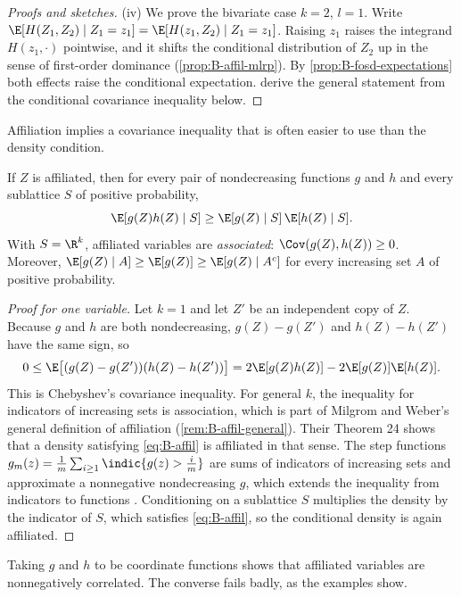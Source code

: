 \begin{proof}[Proofs and sketches]
(iv) We prove the bivariate case $k = 2$, $l = 1$. Write $\E[H(Z_1, Z_2) \mid Z_1 = z_1] = \E[H(z_1, Z_2) \mid Z_1 = z_1]$. Raising
$z_1$ raises the integrand $H(z_1, \cdot)$ pointwise, and it shifts the conditional distribution of $Z_2$ up in the sense of
first-order dominance (\cref{prop:B-affil-mlrp}). By \cref{prop:B-fosd-expectations} both effects raise the
conditional expectation. \citet[Appendix]{MilgromWeber1982} derive the general statement from the conditional
covariance inequality below.
\end{proof}

Affiliation implies a covariance inequality that is often easier to use than the density condition.

\begin{theorem}\label{thm:B-association}
If $Z$ is affiliated, then for every pair of nondecreasing functions $g$ and $h$ and every sublattice $S$ of positive
probability,
\[
  \E[g(Z)h(Z) \mid S] \geq \E[g(Z) \mid S]\,\E[h(Z) \mid S].
\]
With $S = \R^k$, affiliated variables are \emph{associated}: $\Cov(g(Z), h(Z)) \geq 0$. Moreover,
$\E[g(Z) \mid A] \geq \E[g(Z)] \geq \E[g(Z) \mid A^c]$ for every increasing set $A$ of positive probability.
\end{theorem}

\begin{proof}[Proof for one variable]
Let $k = 1$ and let $Z'$ be an independent copy of $Z$. Because $g$ and $h$ are both nondecreasing, $g(Z) - g(Z')$ and
$h(Z) - h(Z')$ have the same sign, so
\[
  0 \leq \E\bigl[(g(Z) - g(Z'))(h(Z) - h(Z'))\bigr] = 2\E[g(Z)h(Z)] - 2\E[g(Z)]\E[h(Z)].
\]
This is Chebyshev's covariance inequality. For general $k$, the inequality for indicators of increasing sets is
association, which is part of Milgrom and Weber's general definition of affiliation (\cref{rem:B-affil-general}).
Their Theorem 24 shows that a density satisfying \eqref{eq:B-affil} is affiliated in that sense. The step functions
$g_m(z) = \frac{1}{m}\sum_{i \geq 1}\indic\{g(z) > \frac{i}{m}\}$ are sums of indicators of increasing sets and approximate a
nonnegative nondecreasing $g$, which extends the inequality from indicators to functions
\citep[Theorems 22--23]{MilgromWeber1982}. Conditioning on a sublattice $S$ multiplies the density by the indicator
of $S$, which satisfies \eqref{eq:B-affil}, so the conditional density is again affiliated.
\end{proof}

Taking $g$ and $h$ to be coordinate functions shows that affiliated variables are nonnegatively correlated. The
converse fails badly, as the examples show.

